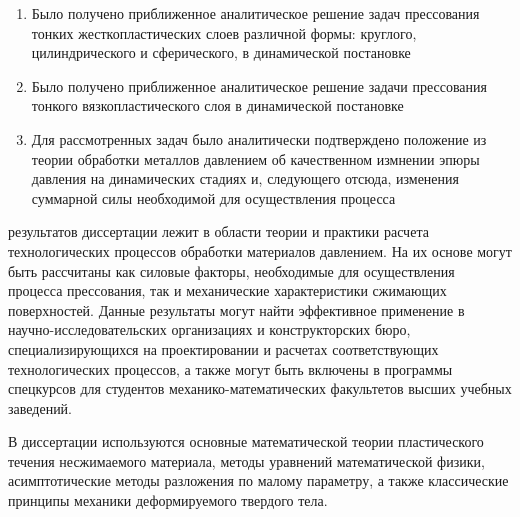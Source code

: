 {\novelty}
\begin{enumerate}[beginpenalty=10000] %
    \item Было получено приближенное аналитическое решение задач прессования тонких жесткопластических слоев различной формы: круглого, цилиндрического и сферического, в динамической постановке
    \item Было получено приближенное аналитическое решение задачи прессования тонкого вязкопластического слоя в динамической постановке
    \item Для рассмотренных задач было аналитически подтверждено положение из теории обработки металлов давлением об качественном измнении эпюры давления  на динамических стадиях и, следующего отсюда, изменения суммарной силы необходимой для осуществления процесса
\end{enumerate}

{\influence} результатов диссертации лежит в области теории и практики расчета технологических процессов обработки материалов давлением. На их основе могут быть рассчитаны как силовые факторы, необходимые для осуществления процесса прессования, так и механические характеристики  сжимающих поверхностей. Данные результаты могут найти эффективное применение в научно-исследовательских организациях и конструкторских бюро, специализирующихся на проектировании и расчетах соответствующих технологических процессов, а также могут быть включены в программы спецкурсов для студентов механико-математических факультетов высших учебных заведений.

{\methods} В диссертации используются основные математической теории пластического течения несжимаемого материала, методы уравнений математической физики, асимптотические методы разложения по малому параметру, а также классические принципы механики деформируемого твердого тела.

